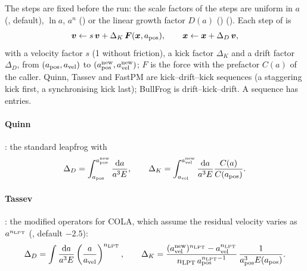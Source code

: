 The steps are fixed before the run: the scale factors of the steps are uniform in $a$ (, default),
$\ln a$, $a^n$ () or the linear growth factor $D(a)$ ()
(). Each step of  is
\begin{equation}
\bm v\leftarrow s\,\bm v+\Delta_K\,\bm F(\bm{x},a_{\rm pos}),\qquad \bm{x}\leftarrow\bm{x}+\Delta_D\,\bm v,
\end{equation}
with a velocity factor $s$ (1 without friction), a kick factor $\Delta_K$ and a drift factor $\Delta_D$, from
$(a_{\rm pos},a_{\rm vel})$ to $(a_{\rm pos}^{\rm new},a_{\rm vel}^{\rm new})$; $F$ is the force with the prefactor $C(a)$ of the
caller. Quinn, Tassev and FastPM are kick--drift--kick sequences (a staggering kick first, a synchronising kick last);
BullFrog is drift--kick--drift. A sequence has  entries.

\paragraph*{Quinn} \cite{Quinn1997}: the standard leapfrog with
\begin{equation}
\Delta_D=\int_{a_{\rm pos}}^{a_{\rm pos}^{\rm new}}\frac{\mathrm{d} a}{a^3E},\qquad
\Delta_K=\int_{a_{\rm vel}}^{a_{\rm vel}^{\rm new}}\frac{\mathrm{d} a}{a^3E}\frac{C(a)}{C(a_{\rm pos})}.
\end{equation}

\paragraph*{Tassev} \cite{Tassev2013}: the modified operators for COLA, which assume the residual velocity varies as
$a^{n_{\rm LPT}}$ (, default $-2.5$):
\begin{equation}
\Delta_D=\int\frac{\mathrm{d} a}{a^3E}\left(\frac{a}{a_{\rm vel}}\right)^{n_{\rm LPT}},\qquad
\Delta_K=\frac{(a_{\rm vel}^{\rm new})^{n_{\rm LPT}}-a_{\rm vel}^{n_{\rm LPT}}}{n_{\rm LPT}\,a_{\rm pos}^{n_{\rm LPT}-1}}\,
\frac{1}{a_{\rm pos}^3E(a_{\rm pos})}.
\end{equation}


